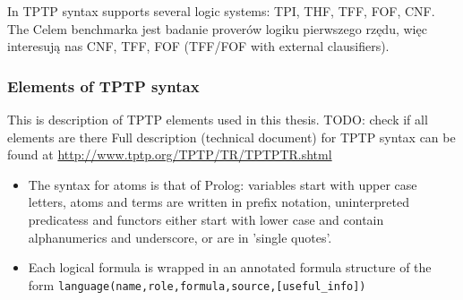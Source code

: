 In TPTP syntax supports several logic systems: \gls{TPI}, \gls{THF}, \gls{TFF}, \gls{FOF}, \gls{CNF}. 
The 
Celem benchmarka jest badanie proverów logiku pierwszego rzędu, więc interesują nas \gls{CNF}, \gls{TFF}, \gls{FOF} (TFF/FOF with external clausifiers).

\subsubsection{Elements of TPTP syntax}

This is description of TPTP elements used in this thesis. TODO: check if all elements are there
\newline
Full description (technical document) for TPTP syntax can be found at \url{http://www.tptp.org/TPTP/TR/TPTPTR.shtml}


\begin{itemize}
  \item The syntax for atoms is that of Prolog: variables start with upper case letters, atoms and terms are written in prefix notation, uninterpreted predicatess and functors either start with lower case and contain alphanumerics and underscore, or are in 'single quotes'.

  \item Each logical formula is wrapped in an annotated formula structure of the form  \newline \texttt{language(name,role,formula,source,[useful_info])}


\end{itemize}
